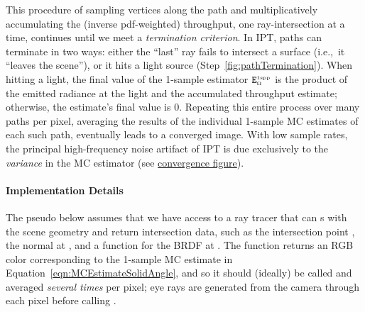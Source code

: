 \noindent This procedure of sampling vertices along the path and multiplicatively accumulating the (inverse pdf-weighted) throughput, one ray-intersection at a time, continues until we meet a \textit{termination criterion}. In IPT, paths can terminate in two ways: either the ``last'' ray fails to intersect a surface (i.e.,\ it ``leaves the scene''), or it hits a light source (Step~\ref{fig:pathTermination}). When hitting a light, the final value of the 1-sample estimator $\mathtt{E}^{\mbox{\tiny{1spp}}}_{\mbox{\tiny{$\Omega$}}}$ is the product of the emitted radiance at the light and the accumulated throughput estimate; otherwise, the estimate's final value is 0. Repeating this entire process over many paths per pixel, averaging the results of the individual 1-sample MC estimates of each such path, eventually leads to a converged image. With low sample rates, the principal high-frequency noise artifact of IPT is due exclusively to the \textit{variance} in the MC estimator (see \hyperref[fig:convergence]{convergence figure}).
%


\newpage

\paragraph{Implementation Details}
\label{sec:IPTcode}

The pseudo below assumes that we have access to a ray tracer that can \code{\textcolor{myred}{intersect}} \code{\textcolor{myblue}{ray}}s with the scene geometry and return \code{\textcolor{myblue}{surface}} intersection data, such as the intersection point , the normal  at , and a function  for the BRDF at . The \code{\textcolor{myred}{Lo}} function returns an RGB color corresponding to the 1-sample MC estimate in Equation~\ref{eqn:MCEstimateSolidAngle}, and so it should (ideally) be called and averaged \textit{several times} per pixel; eye rays  are generated from the camera through each pixel before calling \code{\textcolor{myred}{Lo}}.
%

